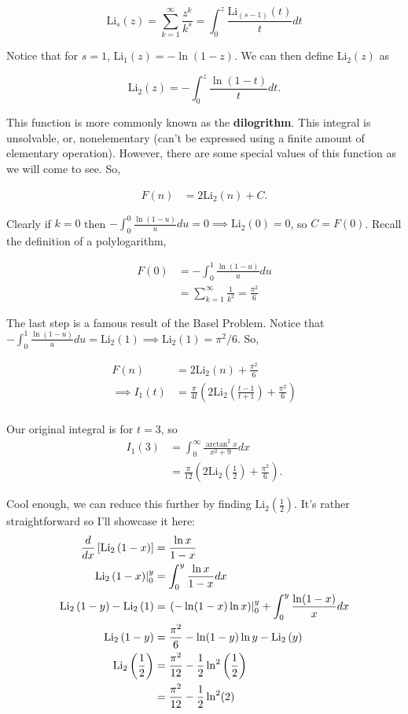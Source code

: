 \documentclass{article}
\newcommand{\Li}[1]{\operatorname{Li_2}{\left(#1\right)}}
\begin{document}
$$
\text{Li}_{s}(z) = \sum_{k=1}^{\infty}{\frac{z^k}{k^s}} = \int_{0}^{z}{\frac{\text{Li}_{(s-1)}(t)}{t}dt}
$$

Notice that for $s = 1$, $\text{Li}_{1}(z) = -\ln(1-z)$. We can then define $\Li{z}$ as

$$
\Li{z} = -\int_{0}^{z}{\frac{\ln(1-t)}{t}dt}.
$$

This function is more commonly known as the \textbf{dilogrithm}. This integral is unsolvable, or, nonelementary (can't be expressed using a finite amount of elementary operation). However, there are some special values of this function as we will come to see. So,

\begin{align*}
    F(n) &= 2\Li{n} + C.
\end{align*}

Clearly if $k = 0$ then $-\int_{0}^{0}{\frac{\ln(1-u)}{u}du} = 0 \implies \Li{0} = 0$, so $C = F(0)$. Recall the definition of a polylogarithm,

\begin{align*}
    F(0) &= -\int_{0}^{1}{\frac{\ln(1-u)}{u}du} \\
    &= \sum_{k=1}^{\infty}{\frac{1}{k^2}} = \frac{\pi^2}{6}
\end{align*}

The last step is a famous result of the Basel Problem. Notice that $-\int_{0}^{1}{\frac{\ln(1-u)}{u}du} = \Li{1} \implies \Li{1} = \pi^2/6$. So,

\begin{align*}
    F(n) &= 2\Li{n} + \frac{\pi^2}{6} \\
    \implies I_1(t) &= \frac{\pi}{4t} \left( 2\Li{\frac{t-1}{t+1}} + \frac{\pi^2}{6} \right) \\
\end{align*}

Our original integral is for $t = 3$, so
\begin{align*}
    I_1(3) &= \int_{0}^{\infty}{\frac{\arctan^2{x}}{x^2 + 9}dx} \\
    &= \frac{\pi}{12} \left( 2\Li{\frac{1}{2}} + \frac{\pi^2}{6} \right).
\end{align*}

Cool enough, we can reduce this further by finding $\Li{\frac{1}{2}}$. It's rather straightforward so I'll showcase it here:
\begin{align*}
    \frac{d}{dx}\left[\Li{1 - x}\right] &= \frac{\ln x}{1-x} \\ 
    \evalat*{\Li{1 - x}}{y}_{0} &= \int_{0}^{y}{\frac{\ln x}{1-x}dx} \\ 
    \Li{1-y} - \Li{1} &= \evalat*{\left(-\ln(1-x)\ln{x}\right)}{y}_{0} + \int_{0}^{y}{\frac{\ln(1-x)}{x}dx} \\
    \Li{1-y} &= \frac{\pi^2}{6}-\ln(1-y)\ln{y} - \Li{y} \\
    \Li{\frac{1}{2}} &= \frac{\pi^2}{12} - \frac{1}{2}\ln^2\left(\frac{1}{2}\right) \\
    &= \frac{\pi^2}{12} - \frac{1}{2}\ln^2(2)
\end{align*}
\end{document}
